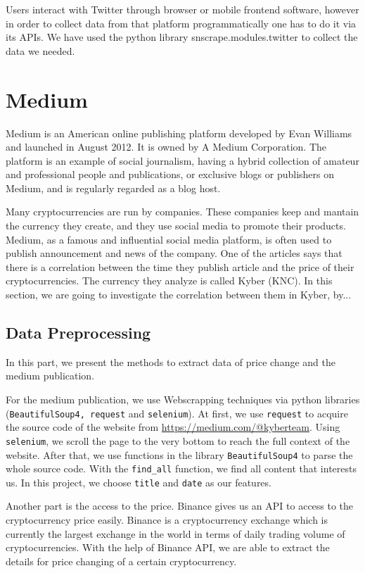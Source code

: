 \documentclass[twoside]{report}
\newcommand{\code}{\texttt}
\begin{document}
\begin{spacing}{1}
Users interact with Twitter through browser or mobile frontend software, however in order to collect data from that platform programmatically one has to do it via its APIs.
We have used the python library snscrape.modules.twitter to collect the data we needed.\\


\section{Medium}
Medium is an American online publishing platform developed by Evan Williams and launched in August 2012. It is owned by A Medium Corporation. The platform is an example of social journalism, having a hybrid collection of amateur and professional people and publications, or exclusive blogs or publishers on Medium, and is regularly regarded as a blog host.

Many cryptocurrencies are run by companies. These companies keep and mantain the currency they create, and they use social media to promote their products. Medium, as a famous and influential social media platform, is often used to publish announcement and news of the company. One of the articles says that there is a correlation between the time they publish article and the price of their cryptocurrencies. The currency they analyze is called Kyber (KNC). In this section, we are going to investigate the correlation between them in Kyber, by...



\subsection{Data Preprocessing}
In this part, we present the methods to extract data of price change and the medium publication. 

For the medium publication, we use Webscrapping techniques via python libraries (\code{BeautifulSoup4, request} and \code{selenium}). At first, we use \code{request} to acquire the source code of the website from \url{https://medium.com/@kyberteam}. Using \code{selenium}, we scroll the page to the very bottom to reach the full context of the website. After that, we use functions in the library \code{BeautifulSoup4} to parse the whole source code. With the \code{find\_all} function, we find all content that interests us. In this project, we choose \code{title} and \code{date} as our features.

Another part is the access to the price. Binance gives us an API to access to the cryptocurrency price easily. Binance is a cryptocurrency exchange which is currently the largest exchange in the world in terms of daily trading volume of cryptocurrencies. With the help of Binance API, we are able to extract the details for price changing of a certain cryptocurrency.


\end{spacing}
\end{document}
